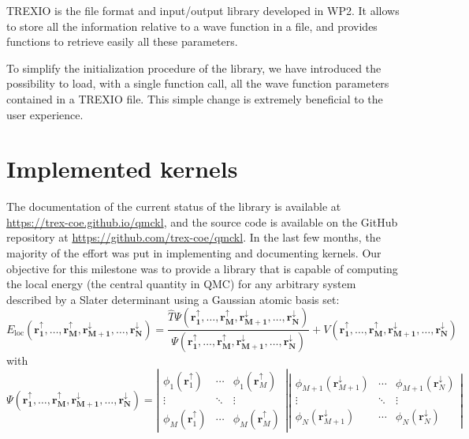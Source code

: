 \ac{TREXIO} is the file format and input/output library developed in
\ac{WP}2. It allows to store all the information relative to a wave
function in a file, and provides functions to retrieve easily all
these parameters. 

To simplify the initialization procedure of the library, we have
introduced the possibility to load, with a single function call, all the
wave function parameters contained in a \ac{TREXIO} file. This simple
change is extremely beneficial to the user experience.


\section{Implemented kernels}

The documentation of the current status of the library is available
at \url{https://trex-coe.github.io/qmckl}, and the source code is
available on the GitHub repository at \url{https://github.com/trex-coe/qmckl}.
In the last few months, the majority of the effort was put in
implementing and documenting kernels.  Our objective for this milestone
was to provide a library that is capable of computing the local energy
(the central quantity in \ac{QMC}) for any arbitrary system described
by a Slater determinant using a Gaussian atomic basis set:
\newcommand{\eloc}{E_{\text{loc}}}
\newcommand{\rr}{\mathbf{r_1^\uparrow,\dots,r_M^\uparrow, r_{M+1}^\downarrow,\dots,r_N^\downarrow}}
\[
\eloc\left(\rr\right) = \frac{\hat{T}{\Psi\left(\rr\right)}}{\Psi\left(\rr\right)}
+ V\left(\rr\right)
\]
with
\[
\Psi\left(\mathbf{r_1^\uparrow,\dots,r_M^\uparrow, r_{M+1}^\downarrow,\dots,r_N^\downarrow}\right) = 
\left|
\begin{array}{ccc}
\phi_1\left(\mathbf{r}_1^\uparrow\right) & \cdots & \phi_1\left(\mathbf{r}_M^\uparrow\right) \\
\vdots & \ddots & \vdots \\
\phi_M\left(\mathbf{r}_1^\uparrow\right) & \cdots & \phi_M\left(\mathbf{r}_M^\uparrow\right) 
\end{array}
\right|
\left|
\begin{array}{ccc}
\phi_{M+1}\left(\mathbf{r}_{M+1}^\downarrow\right) & \cdots & \phi_{M+1}\left(\mathbf{r}_N^\downarrow\right) \\
\vdots & \ddots & \vdots \\
\phi_N\left(\mathbf{r}_{M+1}^\downarrow\right) & \cdots & \phi_N\left(\mathbf{r}_N^\downarrow\right) 
\end{array}
\right|
\]

